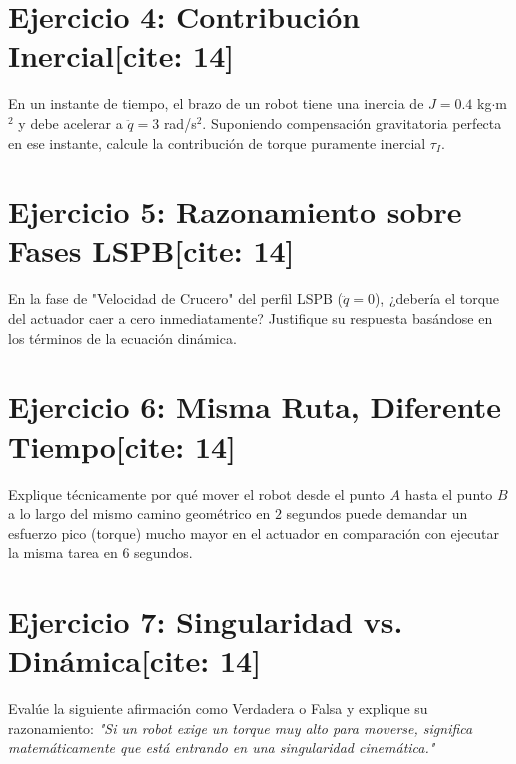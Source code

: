 \documentclass[11pt, a4paper]{article}
\begin{document}
\section*{Ejercicio 4: Contribución Inercial[cite: 14]}
En un instante de tiempo, el brazo de un robot tiene una inercia de $J = 0.4$ kg$\cdot$m$^2$ y debe acelerar a $\ddot{q} = 3$ rad/s$^2$. Suponiendo compensación gravitatoria perfecta en ese instante, calcule la contribución de torque puramente inercial $\tau_I$.
\vspace{2cm}

\section*{Ejercicio 5: Razonamiento sobre Fases LSPB[cite: 14]}
En la fase de "Velocidad de Crucero" del perfil LSPB ($\ddot{q} = 0$), ¿debería el torque del actuador caer a cero inmediatamente? Justifique su respuesta basándose en los términos de la ecuación dinámica.
\vspace{2.5cm}

\section*{Ejercicio 6: Misma Ruta, Diferente Tiempo[cite: 14]}
Explique técnicamente por qué mover el robot desde el punto $A$ hasta el punto $B$ a lo largo del mismo camino geométrico en $2$ segundos puede demandar un esfuerzo pico (torque) mucho mayor en el actuador en comparación con ejecutar la misma tarea en $6$ segundos.
\vspace{3cm}

\section*{Ejercicio 7: Singularidad vs. Dinámica[cite: 14]}
Evalúe la siguiente afirmación como Verdadera o Falsa y explique su razonamiento: \textit{"Si un robot exige un torque muy alto para moverse, significa matemáticamente que está entrando en una singularidad cinemática."}
\vspace{3cm}
\end{document}
